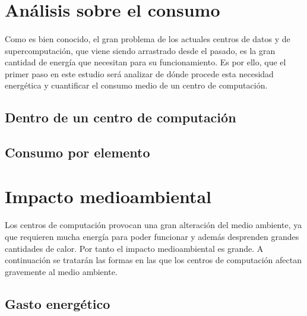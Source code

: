 \documentclass[10pt]{article}
\begin{document}
    \section{Análisis sobre el consumo}
    \label{sec:analisis}
    	\paragraph{}
		Como es bien conocido, el gran problema de los actuales centros de datos y de supercomputación, que viene siendo arrastrado desde el pasado, es la gran cantidad de energía que necesitan para su funcionamiento. Es por ello, que el primer paso en este estudio será analizar de dónde procede esta necesidad energética y cuantificar el consumo medio de un centro de computación.
        
        \subsection{Dentro de un centro de computación}
			\paragraph{}
            
         \subsection{Consumo por elemento}
        
    \section{Impacto medioambiental}
	\label{sec:impacto}

        \paragraph{}
		Los centros de computación provocan una gran alteración del medio ambiente, ya que requieren mucha energía para poder funcionar y además desprenden grandes cantidades de calor. Por tanto el impacto medioambiental es grande. A continuación se tratarán las formas en las que los centros de computación afectan gravemente al medio ambiente.
        
        \subsection{Gasto energético}
        	\paragraph{}
        
\end{document}
